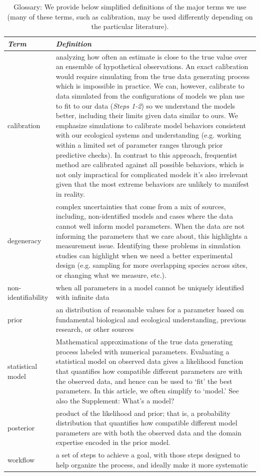 \documentclass[11pt]{article}
\begin{document}
\begin{table}
\caption{Glossary: We provide below simplified definitions of the major terms we use (many of these terms, such as calibration, may be used differently depending on the particular literature). }
\begin{tabular}{ p{3 cm}  p{13 cm} }  \hline \hline
 \emph{Term}   & \emph{Definition}\\ 
\hline \hline
calibration & analyzing how often an estimate is close to the true value over an ensemble of hypothetical observations.  An exact calibration would require simulating from the true data generating process which is impossible in practice.  We can, however, calibrate to data simulated from the configurations of models we plan use to fit to our data (\emph{Steps 1-2}) so we understand the models better, including their limits given data similar to ours. We emphasize simulations to calibrate model behaviors consistent with our ecological systems and understanding (e.g. working within a limited set of parameter ranges through prior predictive checks). In contrast to this approach, frequentist method are calibrated against all possible behaviors, which is not only impractical for complicated models it’s also irrelevant given that the most extreme behaviors are unlikely to manifest in reality. \\\hline
degeneracy & complex uncertainties that come from a mix of sources, including, non-identified models and cases where the data cannot well inform model parameters. When the data are not informing the parameters that we care about, this highlights a measurement issue. Identifying these problems in simulation studies can highlight when we need a better experimental design (e.g. sampling for more overlapping species across sites, or changing what we measure, etc.).  \\\hline
non-identifiability & when all parameters in a model cannot be uniquely identified with infinite data \\\hline
prior & an distribution of reasonable values for a parameter based on fundamental biological and ecological understanding, previous research, or other sources \\\hline
statistical model & Mathematical approximations of the true data generating process labeled with numerical parameters.  Evaluating a statistical model on observed data gives a likelihood function that quantifies how compatible different parameters are with the observed data, and hence can be used to `fit' the best parameters. In this article, we often simplify to `model.' See also the Supplement: What's a model? \\\hline
posterior & product of the likelihood and prior; that is, a probability distribution that quantifies how compatible different model parameters are with both the observed data and the domain expertise encoded in the prior model. \\\hline
workflow & a set of steps to achieve a goal, with those steps designed to help organize the process, and ideally make it more systematic  \\\hline
\hline
\end{tabular}
\label{tab:glossary}
\end{table}
\end{document}
